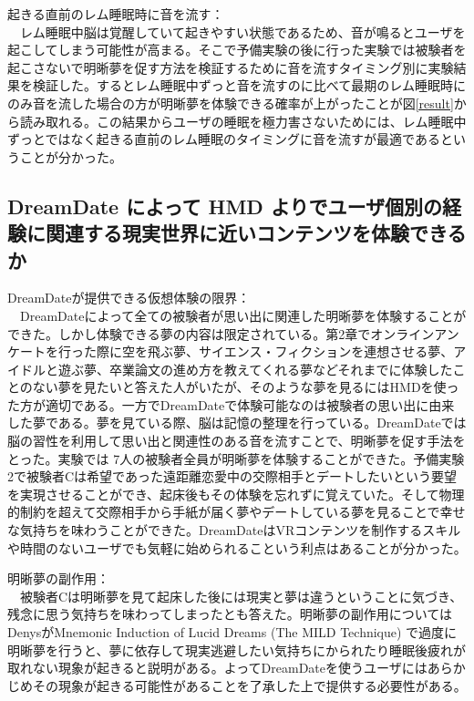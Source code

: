 起きる直前のレム睡眠時に音を流す：\\
　レム睡眠中脳は覚醒していて起きやすい状態であるため、音が鳴るとユーザを起こしてしまう可能性が高まる\cite{remNonRem}。そこで予備実験の後に行った実験では被験者を起こさないで明晰夢を促す方法を検証するために音を流すタイミング別に実験結果を検証した。するとレム睡眠中ずっと音を流すのに比べて最期のレム睡眠時にのみ音を流した場合の方が明晰夢を体験できる確率が上がったことが図\ref{result}から読み取れる。この結果からユーザの睡眠を極力害さないためには、レム睡眠中ずっとではなく起きる直前のレム睡眠のタイミングに音を流すが最適であるということが分かった。

\subsection{DreamDate によって HMD よりでユーザ個別の経験に関連する現実世界に近いコンテンツを体験できるか}
DreamDateが提供できる仮想体験の限界：\\
　DreamDateによって全ての被験者が思い出に関連した明晰夢を体験することができた。しかし体験できる夢の内容は限定されている。第2章でオンラインアンケートを行った際に空を飛ぶ夢、サイエンス・フィクションを連想させる夢、アイドルと遊ぶ夢、卒業論文の進め方を教えてくれる夢などそれまでに体験したことのない夢を見たいと答えた人がいたが、そのような夢を見るにはHMDを使った方が適切である。一方でDreamDateで体験可能なのは被験者の思い出に由来した夢である。夢を見ている際、脳は記憶の整理を行っている\cite{Zhang}。DreamDateでは脳の習性を利用して思い出と関連性のある音を流すことで、明晰夢を促す手法をとった。実験では 7人の被験者全員が明晰夢を体験することができた。予備実験2で被験者Cは希望であった遠距離恋愛中の交際相手とデートしたいという要望を実現させることができ、起床後もその体験を忘れずに覚えていた。そして物理的制約を超えて交際相手から手紙が届く夢やデートしている夢を見ることで幸せな気持ちを味わうことができた。DreamDateはVRコンテンツを制作するスキルや時間のないユーザでも気軽に始められるこという利点はあることが分かった。

明晰夢の副作用：\\
　被験者Cは明晰夢を見て起床した後には現実と夢は違うということに気づき、残念に思う気持ちを味わってしまったとも答えた。明晰夢の副作用についてはDenysがMnemonic Induction of Lucid Dreams (The MILD Technique) で過度に明晰夢を行うと、夢に依存して現実逃避したい気持ちにかられたり睡眠後疲れが取れない現象が起きると説明がある\cite{LaBerge}。よってDreamDateを使うユーザにはあらかじめその現象が起きる可能性があることを了承した上で提供する必要性がある。